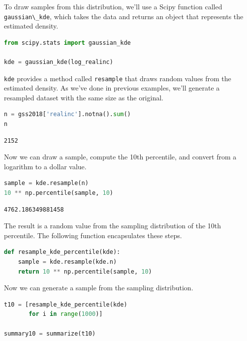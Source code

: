 To draw samples from this distribution, we'll use a Scipy function
called \passthrough{\lstinline!gaussian\_kde!}, which takes the data and
returns an object that represents the estimated density.

\begin{lstlisting}[language=Python,style=source]
from scipy.stats import gaussian_kde

kde = gaussian_kde(log_realinc)
\end{lstlisting}

\passthrough{\lstinline!kde!} provides a method called
\passthrough{\lstinline!resample!} that draws random values from the
estimated density. As we've done in previous examples, we'll generate a
resampled dataset with the same size as the original.

\begin{lstlisting}[language=Python,style=source]
n = gss2018['realinc'].notna().sum()
n
\end{lstlisting}

\begin{lstlisting}[style=output]
2152
\end{lstlisting}

Now we can draw a sample, compute the 10th percentile, and convert from
a logarithm to a dollar value.

\begin{lstlisting}[language=Python,style=source]
sample = kde.resample(n)
10 ** np.percentile(sample, 10)
\end{lstlisting}

\begin{lstlisting}[style=output]
4762.186349881458
\end{lstlisting}

The result is a random value from the sampling distribution of the 10th
percentile. The following function encapsulates these steps.

\begin{lstlisting}[language=Python,style=source]
def resample_kde_percentile(kde):
    sample = kde.resample(kde.n)
    return 10 ** np.percentile(sample, 10)
\end{lstlisting}

Now we can generate a sample from the sampling distribution.

\begin{lstlisting}[language=Python,style=source]
t10 = [resample_kde_percentile(kde)
       for i in range(1000)]

summary10 = summarize(t10)
\end{lstlisting}


